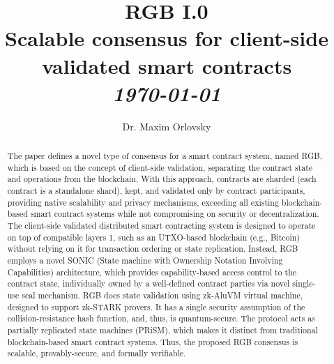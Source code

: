 \documentclass[9pt,oneside]{amsart}
\title[RGB I.0: Scalable consensus for client-side validated smart contracts]{RGB I.0\\Scalable consensus for client-side validated smart contracts\\ \it \today}
\author[M. Orlovsky]{Dr. Maxim Orlovsky}
\begin{document}
\pagecolor{yellow!10}

\begin{abstract}
The paper defines a novel type of consensus for a smart contract system,
named RGB, which is based on the concept of client-side validation,
separating the contract state and operations from the blockchain.
With this approach, contracts are sharded (each contract is a standalone shard),
kept, and validated only by contract participants,
providing native scalability and privacy mechanisms,
exceeding all existing blockchain-based smart contract systems
while not compromising on security or decentralization.
The client-side validated distributed smart contracting system is
designed to operate on top of compatible layers 1,
such as an UTXO-based blockchain (e.g., Bitcoin)
without relying on it for transaction ordering or state replication.
Instead, RGB employs a novel SONIC
(State machine with Ownership Notation Involving Capabilities) architecture,
which provides capability-based access control to the contract state,
individually owned by a well-defined contract parties via novel single-use seal mechanism.
RGB does state validation using zk-AluVM virtual machine, designed to support zk-STARK provers.
It has a single security assumption of the collision-resistance hash function,
and, thus, is quantum-secure.
The protocol acts as partially replicated state machines (PRiSM),
which makes it distinct from traditional blockchain-based smart contract systems.
Thus, the proposed RGB consensus is scalable, provably-secure, and formally verifiable.
\end{abstract}

\maketitle
\end{document}
